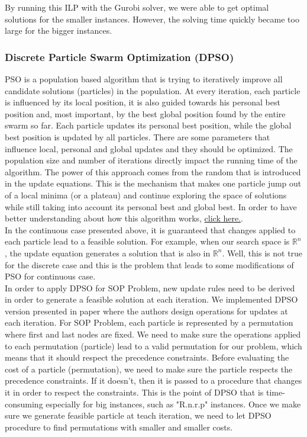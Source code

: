 \documentclass[]{article}
\begin{document}
    By running this ILP with the Gurobi solver, we were able to get optimal solutions for the smaller instances. However, the solving time quickly became too large for the bigger instances.
    
    \subsubsection{Discrete Particle Swarm Optimization (DPSO)}
    
    PSO is a population based algorithm that is trying to iteratively improve all candidate solutions (particles) in the population. At every 
    iteration, each particle is influenced by its local position, it is also guided towards his personal best position and, most important, by the 
    best global position found by the entire swarm so far. Each particle updates its personal best position, while the global best position is 
    updated by all particles. There are some parameters that influence local, personal and global updates and they should be optimized. The 
    population size and number of iterations directly impact the running time of the algorithm. The power of this approach comes from the random 
    that is introduced in the update equations. This is the mechanism that makes one particle jump out of a local minima (or a plateau) and continue 
    exploring the space of solutions while still taking into account its personal best and global best. In order to have better understanding about 
    how this algorithm works, \href{https://upload.wikimedia.org/wikipedia/commons/e/ec/ParticleSwarmArrowsAnimation.gif}{click here.}.\\
    
	In the continuous case presented above, it is guaranteed that changes applied to each particle lead to a feasible solution. For 
	example, when our search space is $ \mathbb{R}^n $, the update equation generates a solution that is also in $ \mathbb{R}^n $. Well, this is not 
	true for the discrete case and this is the problem that leads to some modifications of PSO for continuous case.\\
	
	In order to apply DPSO for SOP Problem, new update rules need to be derived in order to generate a feasible solution at each iteration. We 
	implemented DPSO version presented in paper \cite{DPSO-paper} where the authors design operations for updates at each iteration. For SOP Problem, 
	each particle is represented by a permutation where first and last nodes are fixed. We need to make sure the operations applied to each 
	permutation (particle) lead to a valid permutation for our problem, which means that it should respect the precedence constraints. Before 
	evaluating the cost of a particle (permutation), we need to make sure the particle respects the precedence constraints. If it doesn't, then it is 
	passed to a procedure that changes it in order to respect the constraints. This is the point of DPSO that is time-consuming especially for big 
	instances, such as "R.n.r.p" instances. Once we make sure we generate feasible particle at teach iteration, we need to let DPSO procedure to find 
	permutations with smaller and smaller costs. \\
	
\end{document}
